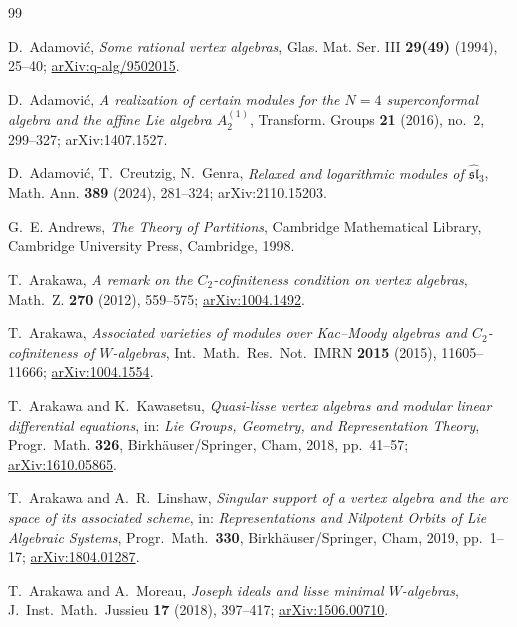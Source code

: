 \documentclass[11pt]{amsart}
\theoremstyle{definition}
\theoremstyle{remark}
\begin{document}
\begin{thebibliography}{99}
\raggedright
{}
D.~Adamovi\'c,
\emph{Some rational vertex algebras},
Glas. Mat. Ser. III \textbf{29(49)} (1994), 25--40;
\href{https://arxiv.org/abs/q-alg/9502015}{arXiv:q-alg/9502015}.



D.~Adamovi\'c,
\emph{A realization of certain modules for the $N=4$ superconformal algebra and the
	affine Lie algebra $A_2^{(1)}$},
Transform. Groups \textbf{21} (2016), no.~2, 299--327; arXiv:1407.1527.

D.~Adamovi\'c, T.~Creutzig, N.~Genra,
\emph{Relaxed and logarithmic modules of $\widehat{\mathfrak{sl}}_3$},
Math. Ann. \textbf{389} (2024), 281--324; arXiv:2110.15203.


G.~E. Andrews,
\emph{The Theory of Partitions},
Cambridge Mathematical Library,
Cambridge University Press, Cambridge, 1998.


T.~Arakawa,
\emph{A remark on the $C_2$-cofiniteness condition on vertex algebras},
Math.~Z. \textbf{270} (2012), 559--575;
\href{https://arxiv.org/abs/1004.1492}{arXiv:1004.1492}.


T.~Arakawa,
\emph{Associated varieties of modules over Kac--Moody algebras and
	$C_2$-cofiniteness of $W$-algebras},
Int.~Math.~Res.~Not.~IMRN \textbf{2015} (2015), 11605--11666;
\href{https://arxiv.org/abs/1004.1554}{arXiv:1004.1554}.

T.~Arakawa and K.~Kawasetsu,
\emph{Quasi-lisse vertex algebras and modular linear differential equations},
in: \emph{Lie Groups, Geometry, and Representation Theory},
Progr.~Math. \textbf{326}, Birkh\"auser/Springer, Cham, 2018, pp.~41--57;
\href{https://arxiv.org/abs/1610.05865}{arXiv:1610.05865}.


T.~Arakawa and A.~R.~Linshaw,
\emph{Singular support of a vertex algebra and the arc space of its associated scheme},
in: \emph{Representations and Nilpotent Orbits of Lie Algebraic Systems},
Progr.~Math.~\textbf{330}, Birkh\"auser/Springer, Cham, 2019, pp.~1--17;
\href{https://arxiv.org/abs/1804.01287}{arXiv:1804.01287}.

T.~Arakawa and A.~Moreau,
\emph{Joseph ideals and lisse minimal $W$-algebras},
J.~Inst.~Math.~Jussieu \textbf{17} (2018), 397--417;
\href{https://arxiv.org/abs/1506.00710}{arXiv:1506.00710}.


\end{thebibliography}
\end{document}
